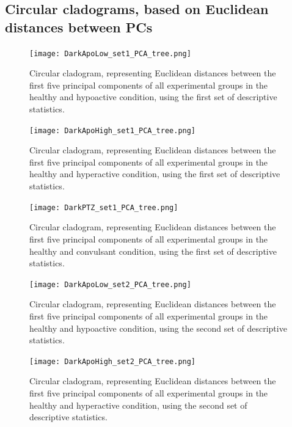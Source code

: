 \documentclass[a4paper,12pt]{article}
\begin{document}
\subsection{Circular cladograms, based on Euclidean distances between PCs}
\begin{figure}[h!]
\begin{center}
\texttt{[image: DarkApoLow\_set1\_PCA\_tree.png]}
\caption{Circular cladogram, representing Euclidean distances between the first five principal components of all experimental groups in the healthy and hypoactive condition, using the first set of descriptive statistics.}
\end{center}
\end{figure}
\begin{figure}[h!]
\begin{center}
\texttt{[image: DarkApoHigh\_set1\_PCA\_tree.png]}
\caption{Circular cladogram, representing Euclidean distances between the first five principal components of all experimental groups in the healthy and hyperactive condition, using the first set of descriptive statistics.}
\end{center}
\end{figure}
\begin{figure}[h!]
\begin{center}
\texttt{[image: DarkPTZ\_set1\_PCA\_tree.png]}
\caption{Circular cladogram, representing Euclidean distances between the first five principal components of all experimental groups in the healthy and convulsant condition, using the first set of descriptive statistics.}
\end{center}
\end{figure}
\begin{figure}[h!]
\begin{center}
\texttt{[image: DarkApoLow\_set2\_PCA\_tree.png]}
\caption{Circular cladogram, representing Euclidean distances between the first five principal components of all experimental groups in the healthy and hypoactive condition, using the second set of descriptive statistics.}
\end{center}
\end{figure}
\begin{figure}[h!]
\begin{center}
\texttt{[image: DarkApoHigh\_set2\_PCA\_tree.png]}
\caption{Circular cladogram, representing Euclidean distances between the first five principal components of all experimental groups in the healthy and hyperactive condition, using the second set of descriptive statistics.}
\end{center}
\end{figure}
\end{document}
